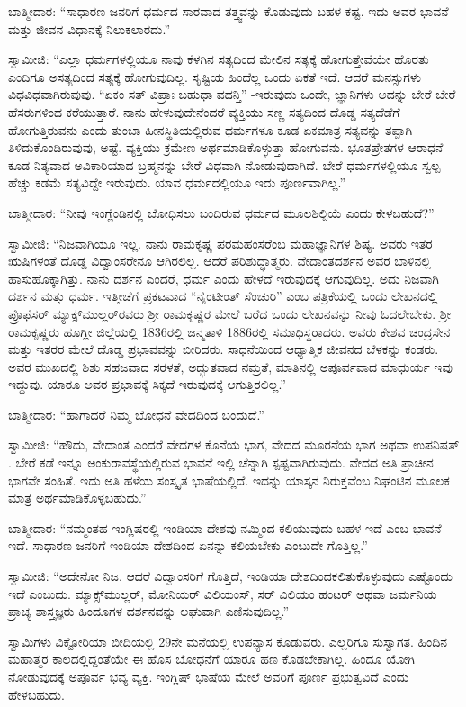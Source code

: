 \vskip 2pt

ಬಾತ್ಮೀದಾರ: “ಸಾಧಾರಣ ಜನರಿಗೆ ಧರ್ಮದ ಸಾರವಾದ ತತ್ತ್ವವನ್ನು ಕೊಡುವುದು ಬಹಳ ಕಷ್ಟ. ಇದು ಅವರ ಭಾವನೆ ಮತ್ತು ಜೀವನ ವಿಧಾನಕ್ಕೆ ನಿಲುಕಲಾರದು.”

\vskip 2pt

ಸ್ವಾಮೀಜಿ: “ಎಲ್ಲಾ ಧರ್ಮಗಳಲ್ಲಿಯೂ ನಾವು ಕೆಳಗಿನ ಸತ್ಯದಿಂದ ಮೇಲಿನ ಸತ್ಯಕ್ಕೆ ಹೋಗುತ್ತೇವೆಯೇ ಹೊರತು ಎಂದಿಗೂ ಅಸತ್ಯದಿಂದ ಸತ್ಯಕ್ಕೆ ಹೋಗುವುದಿಲ್ಲ. ಸೃಷ್ಟಿಯ ಹಿಂದೆಲ್ಲ ಒಂದು ಏಕತೆ ಇದೆ. ಆದರೆ ಮನಸ್ಸುಗಳು ವಿಧವಿಧವಾಗಿರುವುವು. “ಏಕಂ ಸತ್​ ವಿಪ್ರಾಃ ಬಹುಧಾ ವದನ್ತಿ” -ಇರುವುದು ಒಂದೇ, ಜ್ಞಾನಿಗಳು ಅದನ್ನು ಬೇರೆ ಬೇರೆ ಹೆಸರುಗಳಿಂದ ಕರೆಯುತ್ತಾರೆ. ನಾನು ಹೇಳುವುದೇನೆಂದರೆ ವ್ಯಕ್ತಿಯು ಸಣ್ಣ ಸತ್ಯದಿಂದ ದೊಡ್ಡ ಸತ್ಯದೆಡೆಗೆ ಹೋಗುತ್ತಿರುವನು ಎಂದು ತುಂಬಾ ಹೀನಸ್ಥಿತಿಯಲ್ಲಿರುವ ಧರ್ಮಗಳೂ ಕೂಡ ಏಕಮಾತ್ರ ಸತ್ಯವನ್ನು ತಪ್ಪಾಗಿ ತಿಳಿದುಕೊಂಡಿರುವುವು, ಅಷ್ಟೆ. ವ್ಯಕ್ತಿಯು ಕ್ರಮೇಣ ಅರ್ಥಮಾಡಿಕೊಳ್ಳುತ್ತಾ ಹೋಗುವನು. ಭೂತಪ್ರೇತಗಳ ಆರಾಧನೆ ಕೂಡ ನಿತ್ಯವಾದ ಅವಿಕಾರಿಯಾದ ಬ್ರಹ್ಮನನ್ನು ಬೇರೆ ವಿಧವಾಗಿ ನೋಡುವುದಾಗಿದೆ. ಬೇರೆ ಧರ್ಮಗಳಲ್ಲಿಯೂ ಸ್ವಲ್ಪ ಹೆಚ್ಚು ಕಡಮೆ ಸತ್ಯವಿದ್ದೇ ಇರುವುದು. ಯಾವ ಧರ್ಮದಲ್ಲಿಯೂ ಇದು ಪೂರ್ಣವಾಗಿಲ್ಲ.”

\vskip 2pt

ಬಾತ್ಮೀದಾರ: “ನೀವು ಇಂಗ್ಲೆಂಡಿನಲ್ಲಿ ಬೋಧಿಸಲು ಬಂದಿರುವ ಧರ್ಮದ ಮೂಲಶಿಲ್ಪಿಯೆ ಎಂದು ಕೇಳಬಹುದೆ?”

\eject

ಸ್ವಾಮೀಜಿ: “ನಿಜವಾಗಿಯೂ ಇಲ್ಲ. ನಾನು ರಾಮಕೃಷ್ಣ ಪರಮಹಂಸರೆಂಬ ಮಹಾಜ್ಞಾನಿಗಳ ಶಿಷ್ಯ. ಅವರು ಇತರ ಋಷಿಗಳಂತೆ ದೊಡ್ಡ ವಿದ್ವಾಂಸರೇನೂ ಆಗಿರಲಿಲ್ಲ. ಆದರೆ ಪರಿಶುದ್ಧಾತ್ಮರು. ವೇದಾಂತದರ್ಶನ ಅವರ ಬಾಳಿನಲ್ಲಿ ಹಾಸುಹೊಕ್ಕಾಗಿತ್ತು. ನಾನು ದರ್ಶನ ಎಂದರೆ, ಧರ್ಮ ಎಂದು ಹೇಳದೆ ಇರುವುದಕ್ಕೆ ಆಗುವುದಿಲ್ಲ. ಅದು ನಿಜವಾಗಿ ದರ್ಶನ ಮತ್ತು ಧರ್ಮ. ಇತ್ತೀಚೆಗೆ ಪ್ರಕಟವಾದ “ನೈಂಟೀಂತ್​ ಸೆಂಚುರಿ” ಎಂಬ ಪತ್ರಿಕೆಯಲ್ಲಿ ಒಂದು ಲೇಖನದಲ್ಲಿ ಪ್ರೊಫೆಸರ್​ ಮ್ಯಾಕ್ಸ್​ಮುಲ್ಲರ್​ರವರು ಶ‍್ರೀ ರಾಮಕೃಷ್ಣರ ಮೇಲೆ ಬರೆದ ಒಂದು ಲೇಖನವನ್ನು ನೀವು ಓದಲೇಬೇಕು. ಶ‍್ರೀ ರಾಮಕೃಷ್ಣರು ಹೂಗ್ಲೀ ಜಿಲ್ಲೆಯಲ್ಲಿ 1836ರಲ್ಲಿ ಜನ್ಮತಾಳಿ 1886ರಲ್ಲಿ ಸಮಾಧಿಸ್ಥರಾದರು. ಅವರು ಕೇಶವ ಚಂದ್ರಸೇನ ಮತ್ತು ಇತರರ ಮೇಲೆ ದೊಡ್ಡ ಪ್ರಭಾವವನ್ನು ಬೀರಿದರು. ಸಾಧನೆಯಿಂದ ಆಧ್ಯಾತ್ಮಿಕ ಜೀವನದ ಬೆಳಕನ್ನು ಕಂಡರು. ಅವರ ಮುಖದಲ್ಲಿ ಶಿಶು ಸಹಜವಾದ ಸರಳತೆ, ಅದ್ಭುತವಾದ ನಮ್ರತೆ, ಮಾತಿನಲ್ಲಿ ಅಪೂರ್ವವಾದ ಮಾಧುರ್ಯ ಇವು ಇದ್ದುವು. ಯಾರೂ ಅವರ ಪ್ರಭಾವಕ್ಕೆ ಸಿಕ್ಕದೆ ಇರುವುದಕ್ಕೆ ಆಗುತ್ತಿರಲಿಲ್ಲ.”

ಬಾತ್ಮೀದಾರ: “ಹಾಗಾದರೆ ನಿಮ್ಮ ಬೋಧನೆ ವೇದದಿಂದ ಬಂದುದೆ.”

ಸ್ವಾಮೀಜಿ: “ಹೌದು, ವೇದಾಂತ ಎಂದರೆ ವೇದಗಳ ಕೊನೆಯ ಭಾಗ, ವೇದದ ಮೂರನೆಯ ಭಾಗ ಅಥವಾ ಉಪನಿಷತ್​. ಬೇರೆ ಕಡೆ ಇನ್ನೂ ಅಂಕುರಾವಸ್ಥೆಯಲ್ಲಿರುವ ಭಾವನೆ ಇಲ್ಲಿ ಚೆನ್ನಾಗಿ ಸ್ಪಷ್ಟವಾಗಿರುವುದು. ವೇದದ ಅತಿ ಪ್ರಾಚೀನ ಭಾಗವೇ ಸಂಹಿತೆ. ಇದು ಅತಿ ಹಳೆಯ ಸಂಸ್ಕೃತ ಭಾಷೆಯಲ್ಲಿದೆ. ಇದನ್ನು ಯಾಸ್ಕನ ನಿರುಕ್ತವೆಂಬ ನಿಘಂಟಿನ ಮೂಲಕ ಮಾತ್ರ ಅರ್ಥಮಾಡಿಕೊಳ್ಳಬಹುದು.”

ಬಾತ್ಮೀದಾರ: “ನಮ್ಮಂತಹ ಇಂಗ್ಲಿಷರಲ್ಲಿ ಇಂಡಿಯಾ ದೇಶವು ನಮ್ಮಿಂದ ಕಲಿಯುವುದು ಬಹಳ ಇದೆ ಎಂಬ ಭಾವನೆ ಇದೆ. ಸಾಧಾರಣ ಜನರಿಗೆ ಇಂಡಿಯಾ ದೇಶದಿಂದ ಏನನ್ನು ಕಲಿಯಬೇಕು ಎಂಬುದೇ ಗೊತ್ತಿಲ್ಲ.”

ಸ್ವಾಮೀಜಿ: “ಅದೇನೋ ನಿಜ. ಆದರೆ ವಿದ್ವಾಂಸರಿಗೆ ಗೊತ್ತಿದೆ, ಇಂಡಿಯಾ ದೇಶದಿಂದ\break ಕಲಿತುಕೊಳ್ಳುವುದು ಎಷ್ಟೊಂದು ಇದೆ ಎಂಬುದು. ಮ್ಯಾಕ್ಸ್​ಮುಲ್ಲರ್​, ಮೋನಿಯರ್​ ವಿಲಿಯಂಸ್​, ಸರ್​ ವಿಲಿಯಂ ಹಂಟರ್​ ಅಥವಾ ಜರ್ಮನಿಯ ಪ್ರಾಚ್ಯ ಶಾಸ್ತ್ರಜ್ಞರು ಹಿಂದೂಗಳ ದರ್ಶನವನ್ನು ಲಘುವಾಗಿ ಎಣಿಸುವುದಿಲ್ಲ.”

\delimiter

ಸ್ವಾಮಿಗಳು ವಿಕ್ಟೋರಿಯಾ ಬೀದಿಯಲ್ಲಿ 29ನೇ ಮನೆಯಲ್ಲಿ ಉಪನ್ಯಾಸ ಕೊಡುವರು. ಎಲ್ಲರಿಗೂ ಸುಸ್ವಾಗತ. ಹಿಂದಿನ ಮಹಾತ್ಮರ ಕಾಲದಲ್ಲಿದ್ದಂತೆಯೇ ಈ ಹೊಸ ಬೋಧನೆಗೆ ಯಾರೂ ಹಣ ಕೊಡಬೇಕಾಗಿಲ್ಲ. ಹಿಂದೂ ಯೋಗಿ ನೋಡುವುದಕ್ಕೆ ಅಪೂರ್ವ ಭವ್ಯ ವ್ಯಕ್ತಿ. ಇಂಗ್ಲಿಷ್​ ಭಾಷೆಯ ಮೇಲೆ ಅವರಿಗೆ ಪೂರ್ಣ ಪ್ರಭುತ್ವವಿದೆ ಎಂದು ಹೇಳಬಹುದು.

\vspace{-0.5cm}

